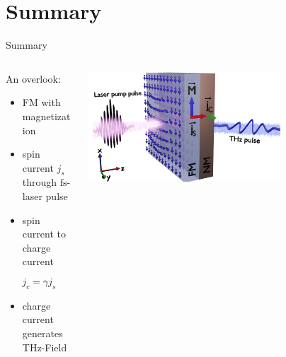 \documentclass[aspectratio=1610, 9pt]{beamer}
\begin{document}
\section{Summary}
\begin{frame}{Summary}
  \begin{columns}
    \begin{column}{.3\textwidth}
      \Large An overlook:
      \normalsize
      \vspace{0.3in}
      \begin{itemize}
        \item FM with magnetization
        \vspace{0.2in}
        \item spin current $j_s$ through $\si{\femto\second}$-laser pulse
        \vspace{0.2in}
        \item spin current to charge current
      \end{itemize}
      \vspace{0.2in}
      \begin{equation*}
        j_c = γj_s
      \end{equation*}
      \begin{itemize}
        \item charge current generates THz-Field
      \end{itemize}
    \end{column}
    \begin{column}{.7\textwidth}
      \begin{center}
        \includegraphics[width=0.7\textwidth]{pics/emitter.png}
      \end{center}
    \end{column}
  \end{columns}
\end{frame}
\end{document}
